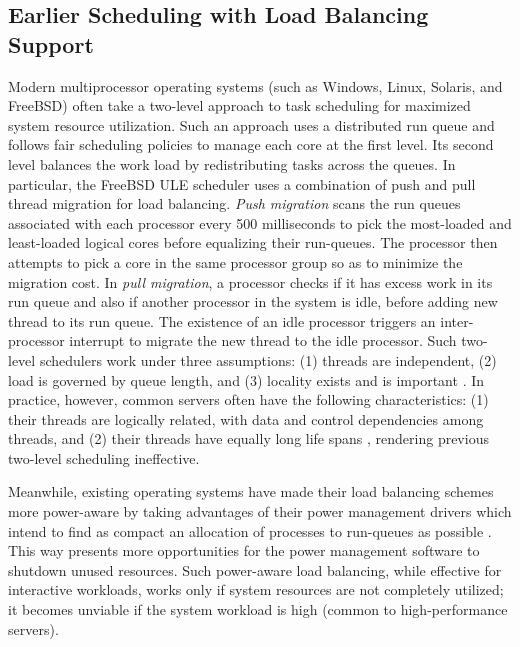 \documentclass[times, 10pt,twocolumn]{IEEEtran}
\begin{document}
\subsection{Earlier Scheduling with Load Balancing Support}
\label{sec:therm-comp-workl}
Modern multiprocessor operating systems (such as Windows, Linux, Solaris,
and FreeBSD) often take a two-level approach to task scheduling for
maximized system resource utilization.
Such an approach uses a distributed run queue and follows fair scheduling policies
to manage each core at the first level.
Its second level balances the work load by redistributing tasks across the queues.  
In particular, the FreeBSD ULE scheduler
\cite{Roberson2003,McKusick2004,McKusick2004b} uses a combination of
push and pull thread migration for load balancing. 
\textit{Push migration} scans the run queues associated with each processor
every 500 milliseconds to pick the most-loaded and least-loaded logical
cores before equalizing their run-queues. 
The processor then attempts to pick a core in the
same processor group so as to minimize the migration cost.
In \textit{pull migration}, a processor checks if it has excess work in
its run queue and also if another processor in the system is idle,
before adding new thread to its run queue.
The existence of an idle processor triggers an inter-processor interrupt
to migrate the new thread to the idle processor.
Such two-level schedulers work under three assumptions:
(1) threads are independent, (2) load is governed by queue length,
and (3) locality exists and is important \cite{Hofmeyr2010}.
In practice, however, common servers often have the following characteristics:
(1) their threads are logically related, with data and control dependencies among threads, 
and (2) their threads have equally long life spans \cite{Hofmeyr2010},
rendering previous two-level scheduling ineffective.

Meanwhile, existing operating systems have made their load balancing schemes
more power-aware by taking advantages of their power management drivers
which intend to find as compact an allocation
of processes to run-queues as possible \cite{Sun2009,Sun2009b,Xia2010,Sarood2011}.
This way presents more opportunities for the power management
software to shutdown unused resources. 
Such power-aware load balancing, while effective for interactive workloads,
works only if system resources are not completely utilized;
it becomes unviable if the system workload is high (common to high-performance servers).
\end{document}
